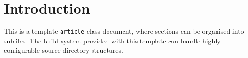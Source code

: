 \documentclass{article}
\begin{document}


\tableofcontents
\listoffigures
\listoftables
\clearpage

\section{Introduction}

This is a template \verb|article| class document, where sections can be
organised into subfiles. The build system provided with this template
can handle highly configurable source directory structures.






\end{document}
